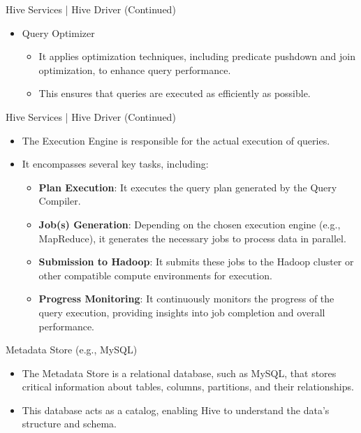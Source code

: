 \begin{frame}{Hive Services | Hive Driver (Continued)}
\begin{itemize}
\item Query Optimizer	
	\begin{itemize}
		\item It applies optimization techniques, including predicate pushdown and join optimization, to enhance query performance.
		\item This ensures that queries are executed as efficiently as possible.
	\end{itemize}
\end{itemize}
\end{frame}
\begin{frame}{Hive Services | Hive Driver (Continued)}
\begin{itemize}
    \item The Execution Engine is responsible for the actual execution of queries.
    \item It encompasses several key tasks, including:
    \begin{itemize}
        \item \textbf{Plan Execution}: It executes the query plan generated by the Query Compiler.
        \item \textbf{Job(s) Generation}: Depending on the chosen execution engine (e.g., MapReduce), it generates the necessary jobs to process data in parallel.
        \item \textbf{Submission to Hadoop}: It submits these jobs to the Hadoop cluster or other compatible compute environments for execution.
        \item \textbf{Progress Monitoring}: It continuously monitors the progress of the query execution, providing insights into job completion and overall performance.
    \end{itemize}
\end{itemize}
\end{frame}



\begin{frame}{Metadata Store (e.g., MySQL)}
	\begin{itemize}
		\item The Metadata Store is a relational database, such as MySQL, that stores critical information about tables, columns, partitions, and their relationships.
		\item This database acts as a catalog, enabling Hive to understand the data's structure and schema.
	\end{itemize}
\end{frame}

